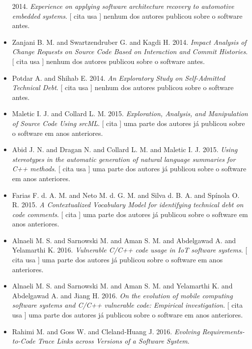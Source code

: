 \begin{itemize}
      2014.
        \textit{ Experience on applying software architecture recovery to automotive embedded systems}.
      [
          cita
          usa
      ]
nenhum dos autores publicou sobre o software antes.
\item Zanjani B. M. and Swartzendruber G. and Kagdi H.
      2014.
        \textit{ Impact Analysis of Change Requests on Source Code Based on Interaction and Commit Histories}.
      [
          cita
          usa
      ]
nenhum dos autores publicou sobre o software antes.
\item Potdar A. and Shihab E.
      2014.
        \textit{ An Exploratory Study on Self-Admitted Technical Debt}.
      [
          cita
          usa
      ]
nenhum dos autores publicou sobre o software antes.
\item Maletic I. J. and Collard L. M.
      2015.
        \textit{ Exploration, Analysis, and Manipulation of Source Code Using srcML}.
      [
          cita
      ]
uma parte dos autores já publicou sobre o software em anos anteriores.
\item Abid J. N. and Dragan N. and Collard L. M. and Maletic I. J.
      2015.
        \textit{ Using stereotypes in the automatic generation of natural language summaries for C++ methods}.
      [
          cita
          usa
      ]
uma parte dos autores já publicou sobre o software em anos anteriores.
\item Farias F. d. A. M. and Neto M. d. G. M. and Silva d. B. A. and Spínola O. R.
      2015.
        \textit{ A Contextualized Vocabulary Model for identifying technical debt on code comments}.
      [
          cita
      ]
uma parte dos autores já publicou sobre o software em anos anteriores.
\item Alnaeli M. S. and Sarnowski M. and Aman S. M. and Abdelgawad A. and Yelamarthi K.
      2016.
        \textit{ Vulnerable C/C++ code usage in IoT software systems}.
      [
          cita
          usa
      ]
uma parte dos autores já publicou sobre o software em anos anteriores.
\item Alnaeli M. S. and Sarnowski M. and Aman S. M. and Yelamarthi K. and Abdelgawad A. and Jiang H.
      2016.
        \textit{ On the evolution of mobile computing software systems and C/C++ vulnerable code: Empirical investigation}.
      [
          cita
          usa
      ]
uma parte dos autores já publicou sobre o software em anos anteriores.
\item Rahimi M. and Goss W. and Cleland-Huang J.
      2016.
        \textit{ Evolving Requirements-to-Code Trace Links across Versions of a Software System}.

\end{itemize}

